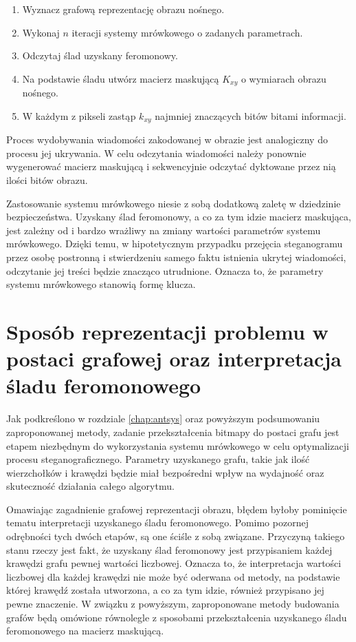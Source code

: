 {{{            \begin{enumerate}
                \item Wyznacz grafową reprezentację obrazu nośnego.
                \item Wykonaj $n$ iteracji systemy mrówkowego o zadanych parametrach.
                \item Odczytaj ślad uzyskany feromonowy.
                \item Na podstawie śladu utwórz macierz maskującą $K_{xy}$ o wymiarach obrazu nośnego.
                \item W każdym z pikseli zastąp $k_{xy}$ najmniej znaczących bitów bitami informacji.
            \end{enumerate}

            Proces wydobywania wiadomości zakodowanej w obrazie jest analogiczny do procesu jej ukrywania. W celu
            odczytania wiadomości należy ponownie wygenerować macierz maskującą i sekwencyjnie odczytać dyktowane przez
            nią ilości bitów obrazu.

            Zastosowanie systemu mrówkowego niesie z sobą dodatkową zaletę w dziedzinie bezpieczeństwa. Uzyskany ślad
            feromonowy, a co za tym idzie macierz maskująca, jest zależny od i bardzo wrażliwy na zmiany wartości
            parametrów systemu mrówkowego. Dzięki temu, w hipotetycznym przypadku przejęcia steganogramu przez osobę
            postronną i stwierdzeniu samego faktu istnienia ukrytej wiadomości, odczytanie jej treści będzie znacząco
            utrudnione. Oznacza to, że parametry systemu mrówkowego stanowią formę klucza.
        }
    }

    \section{Sposób reprezentacji problemu w postaci grafowej oraz interpretacja śladu feromonowego}
    {
        Jak podkreślono w rozdziale \ref{chap:antsys} oraz powyższym podsumowaniu zaproponowanej metody, zadanie
        przekształcenia bitmapy do postaci grafu jest etapem niezbędnym do wykorzystania systemu mrówkowego w celu
        optymalizacji procesu steganograficznego. Parametry uzyskanego grafu, takie jak ilość wierzchołków i krawędzi
        będzie miał bezpośredni wpływ na wydajność oraz skuteczność działania całego algorytmu.

        Omawiając zagadnienie grafowej reprezentacji obrazu, błędem byłoby pominięcie tematu interpretacji uzyskanego
        śladu feromonowego. Pomimo pozornej odrębności tych dwóch etapów, są one ściśle z sobą związane. Przyczyną
        takiego stanu rzeczy jest fakt, że uzyskany ślad feromonowy jest przypisaniem każdej krawędzi grafu pewnej
        wartości liczbowej. Oznacza to, że interpretacja wartości liczbowej dla każdej krawędzi nie może być oderwana od
        metody, na podstawie której krawędź została utworzona, a co za tym idzie, również przypisano jej pewne
        znaczenie. W związku z powyższym, zaproponowane metody budowania grafów będą omówione równolegle z sposobami
        przekształcenia uzyskanego śladu feromonowego na macierz maskującą.

}}
